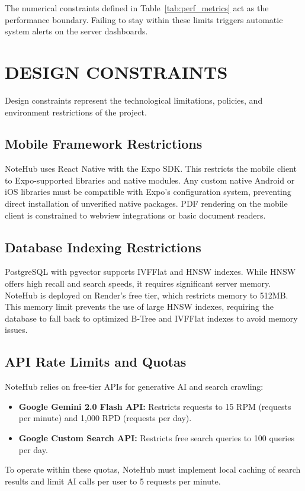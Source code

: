 \documentclass[12,Times new Roman,a4paper]{report}
\begin{document}
The numerical constraints defined in Table~\ref{tab:perf_metrics} act as the performance boundary. Failing to stay within these limits triggers automatic system alerts on the server dashboards.

\section{DESIGN CONSTRAINTS}
Design constraints represent the technological limitations, policies, and environment restrictions of the project.

\subsection{Mobile Framework Restrictions}
NoteHub uses React Native with the Expo SDK. This restricts the mobile client to Expo-supported libraries and native modules. Any custom native Android or iOS libraries must be compatible with Expo's configuration system, preventing direct installation of unverified native packages. PDF rendering on the mobile client is constrained to webview integrations or basic document readers.

\subsection{Database Indexing Restrictions}
PostgreSQL with pgvector supports IVFFlat and HNSW indexes. While HNSW offers high recall and search speeds, it requires significant server memory. NoteHub is deployed on Render's free tier, which restricts memory to 512MB. This memory limit prevents the use of large HNSW indexes, requiring the database to fall back to optimized B-Tree and IVFFlat indexes to avoid memory issues.

\subsection{API Rate Limits and Quotas}
NoteHub relies on free-tier APIs for generative AI and search crawling:
\begin{itemize}
    \item \textbf{Google Gemini 2.0 Flash API:} Restricts requests to 15 RPM (requests per minute) and 1,000 RPD (requests per day).
    \item \textbf{Google Custom Search API:} Restricts free search queries to 100 queries per day.
\end{itemize}
To operate within these quotas, NoteHub must implement local caching of search results and limit AI calls per user to 5 requests per minute.
\end{document}
